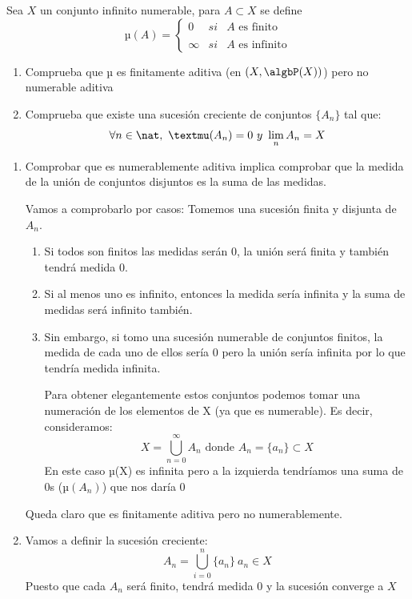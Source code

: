 \begin{problem}
Sea $X$ un conjunto infinito numerable, para $A \subset X$ se define
\[µ(A)=\left\{ \begin{array}{lcc}
             0 &   si  & A \text{ es finito} \\
             \\ \infty &  si  & A \text{ es infinito}
             \end{array}
   \right.\]

\begin{enumerate}
\item Comprueba que µ es finitamente aditiva (en $(X, \algbP (X))$) pero no numerable aditiva
\item Comprueba que existe una sucesión creciente de conjuntos $\{A_n\}$ tal que:
\[\forall n \in \nat, \ µ(A_n)=0 \ y \ \lim_{n} A_n =X\]
\end{enumerate}
\solution
\begin{enumerate}
\item Comprobar que es numerablemente aditiva implica comprobar que la medida de la unión de conjuntos disjuntos es la suma de las medidas.

Vamos a comprobarlo por casos:
Tomemos una sucesión finita y disjunta de $A_n$.
\begin{enumerate}
\item Si todos son finitos las medidas serán 0, la unión será finita y también tendrá medida 0.

\item Si al menos uno es infinito, entonces la medida sería infinita y la suma de medidas será infinito también.

\item Sin embargo, si tomo una sucesión numerable de conjuntos finitos, la medida de cada uno de ellos sería 0 pero la unión sería infinita por lo que tendría medida infinita.

Para obtener elegantemente estos conjuntos podemos tomar una numeración de los elementos de X (ya que es numerable). Es decir, consideramos:
\[X= \bigcup_{n=0}^{\infty}A_n \text{ donde } A_n=\{a_n\}\subset X\]
En este caso µ(X) es infinita pero a la izquierda tendríamos una suma de 0s ($µ(A_n)$) que nos daría 0
\end{enumerate}
Queda claro que es finitamente aditiva pero no numerablemente.

\item Vamos a definir la sucesión creciente:
\[A_n = \bigcup_{i=0}^{n}\{a_n\} \ a_n \in X\]
Puesto que cada $A_n$ será finito, tendrá medida 0 y la sucesión converge a $X$
\end{enumerate}

\end{problem}

